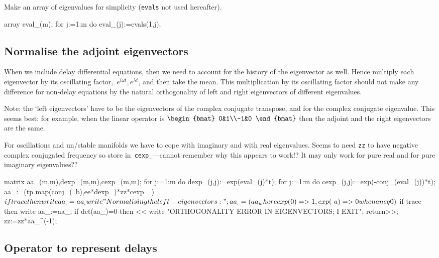 \documentclass[11pt,a5paper]{article}
\begin{document}
Make an array of eigenvalues for simplicity (\verb|evals|
not used hereafter).
\begin{reduce}
array eval_(m);
for j:=1:m do eval_(j):=evals(1,j);
\end{reduce}



\subsection{Normalise the adjoint eigenvectors}
When we include delay differential equations, then we need
to account for the history of the eigenvector as well. Hence
multiply each eigenvector by its oscillating
factor,~\(e^{i\omega t}, e^{\lambda t}\), and then take the
mean. This multiplication by its oscillating factor should
not make any difference for non-delay equations by the
natural orthogonality of left and right eigenvectors of
different eigenvalues. 

Note: the `left eigenvectors' have to be the eigenvectors of
the complex conjugate transpose, and for the complex
conjugate eigenvalue. This seems best: for example, when the
linear operator is \(\begin{bmat} 0&1\\-1&0 \end{bmat}\)
then the adjoint and the right eigenvectors are the same.

For oscillations and un/stable manifolds we have to cope
with imaginary and with real eigenvalues. Seems to need
\verb|zz| to have negative complex conjugated frequency so
store in~\verb|cexp_|---cannot remember why this appears to
work!?  It may only work for pure real and for pure
imaginary eigenvalues??

\begin{reduce}
matrix aa_(m,m),dexp_(m,m),cexp_(m,m);
for j:=1:m do dexp_(j,j):=exp(eval_(j)*t);
for j:=1:m do cexp_(j,j):=exp(-conj_(eval_(j))*t); 
aa_:=(tp map(conj_(~b),ee*dexp_)*zz*cexp_ )$
if trace then write aa_:=aa_;
write "Normalising the left-eigenvectors:";
aa_:=(aa_ where {exp(0)=>1, exp(~a)=>0 when a neq 0})$
if trace then write aa_:=aa_;
if det(aa_)=0 then << write
    "ORTHOGONALITY ERROR IN EIGENVECTORS; I EXIT"; 
    return>>;
zz:=zz*aa_^(-1);
\end{reduce}


\subsection{Operator to represent delays}
\end{document}

